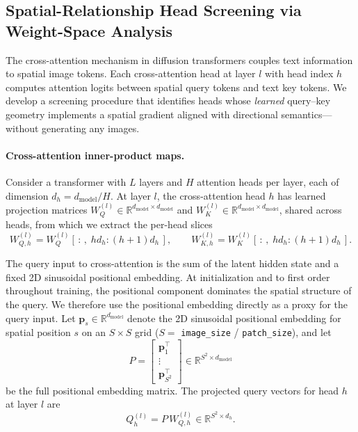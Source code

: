\subsection{Spatial-Relationship Head Screening via Weight-Space Analysis}\label{method:head_screening}

The cross-attention mechanism in diffusion transformers couples text information to spatial image tokens. Each cross-attention head at layer $l$ with head index $h$ computes attention logits between spatial query tokens and text key tokens. We develop a screening procedure that identifies heads whose \emph{learned} query--key geometry implements a spatial gradient aligned with directional semantics---without generating any images.

\paragraph{Cross-attention inner-product maps.}
Consider a transformer with $L$ layers and $H$ attention heads per layer, each of dimension $d_h = d_{\mathrm{model}} / H$. At layer $l$, the cross-attention head $h$ has learned projection matrices $W_Q^{(l)} \in \mathbb{R}^{d_{\mathrm{model}} \times d_{\mathrm{model}}}$ and $W_K^{(l)} \in \mathbb{R}^{d_{\mathrm{model}} \times d_{\mathrm{model}}}$, shared across heads, from which we extract the per-head slices
\begin{equation}
    W_{Q,h}^{(l)} = W_Q^{(l)}[\,:\,,\; h d_h : (h{+}1)d_h\,], \qquad
    W_{K,h}^{(l)} = W_K^{(l)}[\,:\,,\; h d_h : (h{+}1)d_h\,].
\end{equation}

The query input to cross-attention is the sum of the latent hidden state and a fixed 2D sinusoidal positional embedding. At initialization and to first order throughout training, the positional component dominates the spatial structure of the query. We therefore use the positional embedding directly as a proxy for the query input. Let $\mathbf{p}_s \in \mathbb{R}^{d_{\mathrm{model}}}$ denote the 2D sinusoidal positional embedding for spatial position $s$ on an $S \times S$ grid ($S = $ \texttt{image\_size} / \texttt{patch\_size}), and let
\begin{equation}
    P = \begin{bmatrix} \mathbf{p}_1^\top \\ \vdots \\ \mathbf{p}_{S^2}^\top \end{bmatrix} \in \mathbb{R}^{S^2 \times d_{\mathrm{model}}}
\end{equation}
be the full positional embedding matrix. The projected query vectors for head $h$ at layer $l$ are
\begin{equation}
    Q_h^{(l)} = P \, W_{Q,h}^{(l)} \in \mathbb{R}^{S^2 \times d_h}.
\end{equation}

